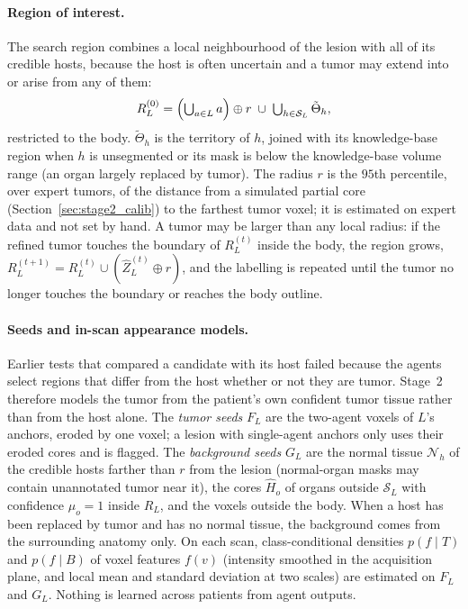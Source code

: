 \documentclass[fleqn,10pt]{olplainarticle}
\begin{document}
\paragraph{Region of interest.} The search region combines a local neighbourhood of the lesion with all of its credible
hosts, because the host is often uncertain and a tumor may extend into or arise from any of them:
\begin{equation}
\label{eq:roi}
R_L^{(0)}=\Bigl(\textstyle\bigcup_{a\in L}a\Bigr)\oplus r\;\cup\;\bigcup_{h\in\mathcal{S}_L}\tilde\Theta_h ,
\end{equation}
restricted to the body. $\tilde\Theta_h$ is the territory of $h$, joined with its knowledge-base region when $h$ is
unsegmented or its mask is below the knowledge-base volume range (an organ largely replaced by tumor). The radius $r$ is
the $95$th percentile, over expert tumors, of the distance from a simulated partial core (Section~\ref{sec:stage2_calib})
to the farthest tumor voxel; it is estimated on expert data and not set by hand. A tumor may be larger than any local
radius: if the refined tumor touches the boundary of $R_L^{(t)}$ inside the body, the region grows,
$R_L^{(t+1)}=R_L^{(t)}\cup(\hat Z_L^{(t)}\oplus r)$, and the labelling is repeated until the tumor no longer touches the
boundary or reaches the body outline.

\paragraph{Seeds and in-scan appearance models.} Earlier tests that compared a candidate with its host failed because the
agents select regions that differ from the host whether or not they are tumor. Stage~2 therefore models the tumor from the
patient's own confident tumor tissue rather than from the host alone. The \emph{tumor seeds} $F_L$ are the two-agent voxels
of $L$'s anchors, eroded by one voxel; a lesion with single-agent anchors only uses their eroded cores and is flagged. The
\emph{background seeds} $G_L$ are the normal tissue $\mathcal{N}_h$ of the credible hosts farther than $r$ from the lesion
(normal-organ masks may contain unannotated tumor near it), the cores $\hat H_o$ of organs outside $\mathcal{S}_L$ with
confidence $\mu_o=1$ inside $R_L$, and the voxels outside the body. When a host has been replaced by tumor and has no normal
tissue, the background comes from the surrounding anatomy only. On each scan, class-conditional densities $p(f\mid T)$ and
$p(f\mid B)$ of voxel features $f(v)$ (intensity smoothed in the acquisition plane, and local mean and standard deviation at
two scales) are estimated on $F_L$ and $G_L$. Nothing is learned across patients from agent outputs.
\end{document}
